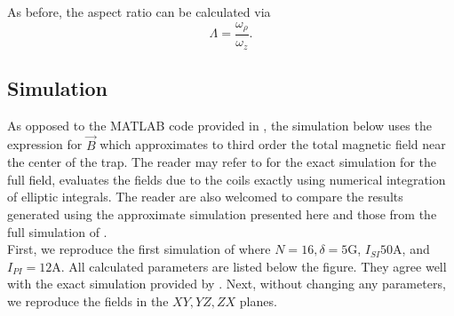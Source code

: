 \documentclass{article}
\theoremstyle{definition}
\newcommand{\f}[2]{\frac{#1}{#2}}
\begin{document}
As before, the aspect ratio can be calculated via
\begin{equation*}
\Lambda = \f{\omega_\rho}{\omega_z}.
\end{equation*}



\subsection{Simulation}
As opposed to the MATLAB code provided in \cite{allcoil}, the simulation below uses the expression for $\vec{B}$ which approximates to third order the total magnetic field near the center of the trap. The reader may refer to \cite{allcoil} for the exact simulation for the full field, evaluates the fields due to the coils exactly using numerical integration of elliptic integrals. The reader are also welcomed to compare the results generated using the approximate simulation presented here and those from the full simulation of \cite{allcoil}.\\


First, we reproduce the first simulation of \cite{allcoil} where $N = 16, \delta = 5$G, $I_{SI} 50$A, and $I_{PI}=12$A. All calculated parameters are listed below the figure. They agree well with the exact simulation provided by \cite{allcoil}. Next, without changing any parameters, we reproduce the fields in the $XY,YZ,ZX$ planes.
\end{document}
